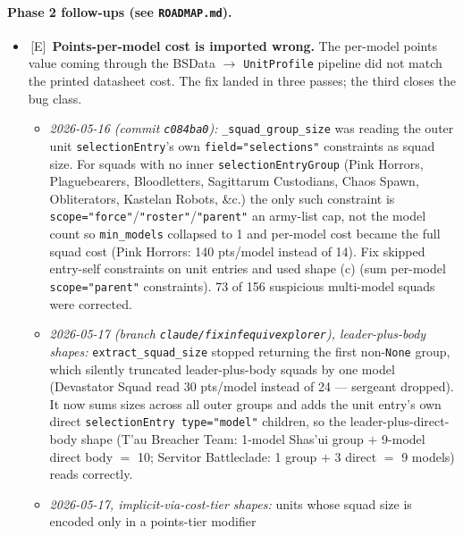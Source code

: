 \documentclass[11pt,a4paper]{article}
\newcommand{\eddie}{\textcolor{eddieblue}{\textsf{[E]}}}
\newcommand{\done}{\ding{51}\,}     %
\begin{document}
\paragraph{Phase 2 follow-ups (see \texttt{ROADMAP.md}).}
\begin{itemize}[label={},leftmargin=*,itemsep=2pt]
  \item \done \eddie\ \textbf{Points-per-model cost is imported wrong.}
    The per-model points value coming through the BSData $\to$
    \texttt{UnitProfile} pipeline did not match the printed datasheet
    cost. The fix landed in three passes; the third closes the bug
    class.
    \begin{itemize}[label={},leftmargin=*,itemsep=2pt]
      \item \emph{2026-05-16 (commit \texttt{c084ba0}):}
        \texttt{\_squad\_group\_size} was reading the outer unit
        \texttt{selectionEntry}'s own \texttt{field="selections"}
        constraints as squad size. For squads with no inner
        \texttt{selectionEntryGroup} (Pink Horrors, Plaguebearers,
        Bloodletters, Sagittarum Custodians, Chaos Spawn, Obliterators,
        Kastelan Robots, \&c.) the only such constraint is
        \texttt{scope="force"}/\texttt{"roster"}/\texttt{"parent"}
        \textemdash{} an army-list cap, not the model count \textemdash{}
        so \texttt{min\_models} collapsed to 1 and per-model cost became
        the full squad cost (Pink Horrors: 140 pts/model instead of 14).
        Fix skipped entry-self constraints on unit entries and used
        shape (c) (sum per-model \texttt{scope="parent"} constraints).
        73 of 156 suspicious multi-model squads were corrected.
      \item \emph{2026-05-17 (branch \texttt{claude/fixinfequivexplorer}),
        leader-plus-body shapes:} \texttt{extract\_squad\_size} stopped
        returning the first non-\texttt{None} group, which silently
        truncated leader-plus-body squads by one model (Devastator
        Squad read 30 pts/model instead of 24 — sergeant dropped). It
        now sums sizes across all outer groups and adds the unit
        entry's own direct \texttt{selectionEntry type="model"} children,
        so the leader-plus-direct-body shape (T'au Breacher Team:
        1-model Shas'ui group $+$ 9-model direct body $=$ 10;
        Servitor Battleclade: 1 group $+$ 3 direct $=$ 9 models)
        reads correctly.
      \item \emph{2026-05-17, implicit-via-cost-tier shapes:} units
        whose squad size is encoded only in a points-tier modifier

\end{itemize}
\end{itemize}
\end{document}
